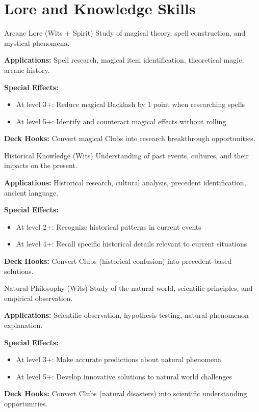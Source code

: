 \section{Lore and Knowledge Skills}

\begin{skillbox}{Arcane Lore (Wits + Spirit)}
Study of magical theory, spell construction, and mystical phenomena.

\textbf{Applications:} Spell research, magical item identification, theoretical magic, arcane history.

\textbf{Special Effects:}
\begin{itemize}
    \item At level 3+: Reduce magical Backlash by 1 point when researching spells
    \item At level 5+: Identify and counteract magical effects without rolling
\end{itemize}

\textbf{Deck Hooks:} Convert magical Clubs into research breakthrough opportunities.
\end{skillbox}

\begin{skillbox}{Historical Knowledge (Wits)}
Understanding of past events, cultures, and their impacts on the present.

\textbf{Applications:} Historical research, cultural analysis, precedent identification, ancient language.

\textbf{Special Effects:}
\begin{itemize}
    \item At level 2+: Recognize historical patterns in current events
    \item At level 4+: Recall specific historical details relevant to current situations
\end{itemize}

\textbf{Deck Hooks:} Convert Clubs (historical confusion) into precedent-based solutions.
\end{skillbox}

\begin{skillbox}{Natural Philosophy (Wits)}
Study of the natural world, scientific principles, and empirical observation.

\textbf{Applications:} Scientific observation, hypothesis testing, natural phenomenon explanation.

\textbf{Special Effects:}
\begin{itemize}
    \item At level 3+: Make accurate predictions about natural phenomena
    \item At level 5+: Develop innovative solutions to natural world challenges
\end{itemize}

\textbf{Deck Hooks:} Convert Clubs (natural disasters) into scientific understanding opportunities.
\end{skillbox}

